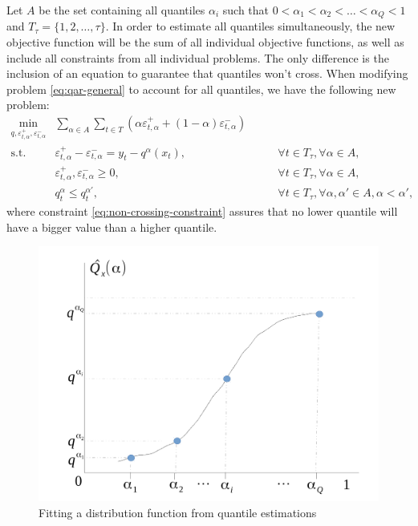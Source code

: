 Let $A$ be the set containing all quantiles $\alpha_i$ such that $0 < \alpha_1 < \alpha_2 < \dots < \alpha_Q < 1$ and $T_\tau = \{1, 2, \dots, \tau\}$. In order to estimate all quantiles simultaneously, the new objective function will be the sum of all individual objective functions, as well as include all constraints from all individual problems. The only difference is the inclusion of an equation to guarantee that quantiles won't cross. When modifying problem \ref{eq:qar-general} to account for all quantiles, we have the following new problem:
\begin{eqnarray}
\label{eq:non-crossing-quantiles1}
\min_{q,\varepsilon_{t,\alpha}^{+}, \varepsilon_{t,\alpha}^{-}} &  \sum_{\alpha \in A} \sum_{t \in T}\left(\alpha \varepsilon_{t,\alpha}^{+}+(1-\alpha)\varepsilon_{t,\alpha}^{-}\right) &  \\
\mbox{s.t. } & \varepsilon_{t,\alpha}^{+}-\varepsilon_{t,\alpha}^{-}=y_{t}-q^\alpha(x_{t}), & \qquad\forall t \in T_\tau,\forall \alpha \in A,\\
& \varepsilon_{t,\alpha}^+,\varepsilon_{t,\alpha}^- \geq 0, & \qquad\forall t \in T_\tau,\forall \alpha \in A,\\\label{eq:non-crossing-constraint}
& q_t^{\alpha} \leq q_t^{\alpha'}, & \qquad \forall t \in T_\tau, \forall \alpha, \alpha' \in A, \alpha < \alpha', 
\end{eqnarray}
where constraint \ref{eq:non-crossing-constraint} assures that no lower quantile will have a bigger value than a higher quantile. 



\begin{figure}[h]
\centering
\includegraphics[width=0.7\linewidth]{Figuras/grafico-quantis-fx}
\caption{Fitting a distribution function from quantile estimations}
\label{fig:grafico-quantis-fx}
\end{figure}

